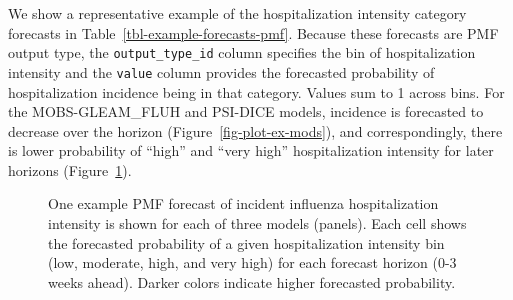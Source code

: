 \documentclass[
  article,
  shortnames,
  notitle]{jss}
\begin{document}
\begin{longtable}[]
\caption{\label{tbl-example-forecasts-pmf}Example PMF model output for
forecasts of incident influenza hospitalization intensity. A subset of
predictions are shown: 1-week ahead PMF forecasts made on 2022-12-17 for
Massachusetts from three distinct models. We round the forecasted
probability (in the \texttt{value} column) to two digits. The
\texttt{location}, \texttt{reference\_date} and
\texttt{target\_end\_date} columns have been omitted for brevity. This
example data is provided in the  package.}

\tabularnewline
\end{longtable}

We show a representative example of the hospitalization intensity
category forecasts in Table~\ref{tbl-example-forecasts-pmf}. Because
these forecasts are PMF output type, the \texttt{output\_type\_id}
column specifies the bin of hospitalization intensity and the
\texttt{value} column provides the forecasted probability of
hospitalization incidence being in that category. Values sum to 1 across
bins. For the MOBS-GLEAM\_FLUH and PSI-DICE models, incidence is
forecasted to decrease over the horizon (Figure~\ref{fig-plot-ex-mods}),
and correspondingly, there is lower probability of ``high'' and ``very
high'' hospitalization intensity for later horizons
(Figure~\ref{fig-plot-ex-mods-pmf}).

\begin{figure}


\caption{\label{fig-plot-ex-mods-pmf}One example PMF forecast of
incident influenza hospitalization intensity is shown for each of three
models (panels). Each cell shows the forecasted probability of a given
hospitalization intensity bin (low, moderate, high, and very high) for
each forecast horizon (0-3 weeks ahead). Darker colors indicate higher
forecasted probability.}

\end{figure}%
\end{document}
